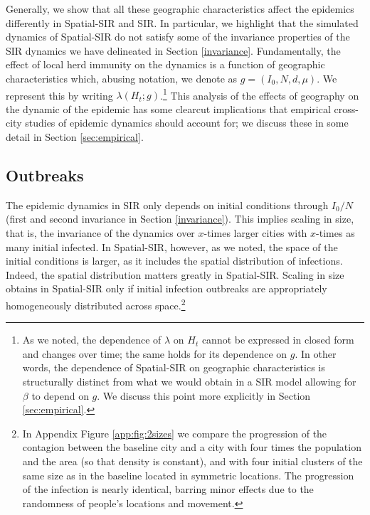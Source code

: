 \documentclass[english,11pt]{article}
\begin{document}
Generally, we show that all these geographic characteristics affect the epidemics differently in Spatial-SIR and SIR. In particular, we highlight that the simulated dynamics of Spatial-SIR do not satisfy some of the invariance properties of the SIR dynamics we have delineated in Section \ref{invariance}. Fundamentally, the effect of local herd immunity on the dynamics is a function of geographic characteristics which, abusing notation, we denote as  $g=(I_0,N, d, \mu)$. We represent this by writing $ \lambda \left( H_t; g\right)  $.\footnote{As we noted, the dependence of  $\lambda$ on  $H_t$ cannot be expressed in closed form and changes over time; the same holds for its dependence on $g$. In other words, the dependence of Spatial-SIR on geographic characteristics is structurally distinct from what we would obtain in a SIR model allowing for  $\beta$ to depend on  $g$. We discuss this point more explicitly in Section \ref{sec:empirical}.}  This analysis of the effects of geography on the dynamic of the epidemic has some clearcut implications that empirical cross-city studies of epidemic dynamics should account for; we discuss these in some detail in Section \ref{sec:empirical}. 


\subsection{Outbreaks}\label{sec:outbreaks}

The epidemic dynamics in SIR only depends on initial conditions through ${I_0}/{N}$ (first and second invariance in Section \ref{invariance}). This implies scaling in size, that is, the invariance of the dynamics over $x$-times larger cities with $x$-times as many initial infected. 
 In Spatial-SIR, however, as we noted, the space of the initial conditions is larger, as it includes the spatial distribution of infections. Indeed, the spatial distribution matters greatly in Spatial-SIR. Scaling in size obtains in Spatial-SIR only if initial infection outbreaks are appropriately homogeneously distributed across space.\footnote{In Appendix Figure 
\ref{app:fig:2sizes} we compare the  
progression of the contagion between the baseline city 
and a city with four
times the population and the area (so that density is constant), and with four initial clusters of the same size as in the baseline
located in symmetric locations. The progression of the infection is nearly identical, barring minor effects due to the randomness of people's locations and movement.} 
\end{document}
